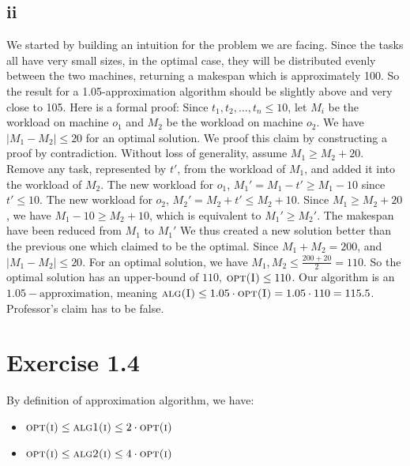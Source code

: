 \documentclass[11pt]{article}
\begin{document}
\subsection*{ii} \noindent
We started by building an intuition for the problem we are facing. 
Since the tasks all have very small sizes, in the optimal case, they will be distributed evenly between the two machines, 
returning a makespan which is approximately 100. So the result for a 1.05-approximation algorithm should be slightly above and very close to 105.
\newline
Here is a formal proof:  
Since $t_1, t_2, \dots, t_n \leq 10$, let $M_{i}$ be the workload on machine $o_{1}$ and $M_{2}$ be the workload on machine $o_{2}$.
We have $|M_{1} - M_{2}| \leq 20$ for an optimal solution. 
\newline
We proof this claim by constructing a proof by contradiction. Without loss of generality, assume $M_{1} \geq M_{2} + 20$. 
Remove any task, represented by $t'$, from the workload of $M_{1}$, and added it into the workload of $M_{2}$. 
The new workload for $o_{1}$, $M_{1}' = M_{1} - t' \geq M_{1} - 10$ since $t' \leq 10$. 
The new workload for $o_{2}$, $M_{2}' = M_{2} + t' \leq M_{2} + 10$. Since $M_{1} \geq M_{2} + 20$, we have $M_{1} - 10 \geq M_{2} + 10$, 
which is equivalent to $M_{1}' \geq M_{2}'$. The makespan have been reduced from $M_{1}$ to $M_{1}'$
We thus created a new solution better than the previous one which claimed to be the optimal. 
\newline
Since $M_{1} + M_{2} = 200$, and $|M_{1} - M_{2}| \leq 20$. For an optimal solution, we have $M_{1}, M_{2} \leq \frac{200 + 20}{2} = 110$.
So the optimal solution has an upper-bound of $110$, $\textsc{opt(I)} \leq 110$. 
Our algorithm is an $1.05-\text{approximation}$, meaning $\textsc{alg(I)} \leq 1.05 \cdot \textsc{opt(I)} = 1.05 \cdot 110 = 115.5$. 
\newline
Professor's claim has to be false.

\section*{Exercise 1.4}
By definition of approximation algorithm, we have:
\begin{itemize}
  \item $ \textsc{opt(i)} \leq \textsc{alg1(i)} \leq 2 \cdot \textsc{opt(i)}$
  \item $ \textsc{opt(i)} \leq \textsc{alg2(i)} \leq 4 \cdot \textsc{opt(i)}$
\end{itemize}
\end{document}

